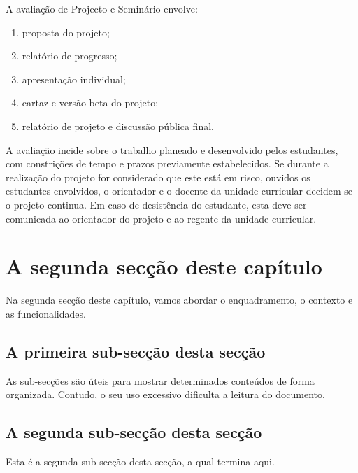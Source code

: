 A avaliação de Projecto e Seminário envolve:
\begin{enumerate}
    \item proposta do projeto;
    \item relatório de progresso;
    \item apresentação individual;
    \item cartaz e versão beta do projeto;
    \item relatório de projeto e discussão pública final.
\end{enumerate}

A avaliação incide sobre o trabalho planeado e desenvolvido pelos estudantes, com constrições de tempo e prazos previamente estabelecidos. Se durante a realização do projeto for considerado que este está em risco, ouvidos os estudantes envolvidos, o orientador e o docente da unidade curricular decidem se o projeto continua. Em caso de desistência do estudante, esta deve ser comunicada ao orientador do projeto e ao regente da unidade curricular.


\section{A segunda secção deste capítulo} \label{sec32}
Na segunda secção deste capítulo, vamos abordar o enquadramento,
o contexto e as funcionalidades.

\subsection{A primeira sub-secção desta secção} \label{sec321}
As sub-secções são úteis para mostrar determinados conteúdos de forma
organizada. Contudo, o seu uso excessivo dificulta a leitura do documento.

\subsection{A segunda sub-secção desta secção} \label{sec322}
Esta é a segunda sub-secção desta secção, a qual termina aqui.


